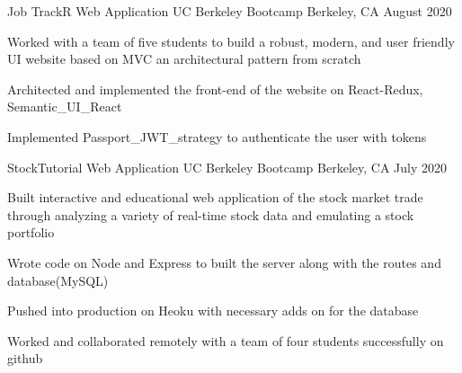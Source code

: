 \vspace{-5mm}
\vspace{-0.5mm}
\begin{cventries}
\cventry
    {Job TrackR Web Application}
    {UC Berkeley Bootcamp}
    {Berkeley, CA}
    {August 2020}
    {
      \begin{cvitems}
        \vspace{0.5mm} 
        \item {Worked with a team of five students to build a robust, modern, and user friendly UI website based on MVC an architectural pattern from scratch}
        \vspace{0.5mm}
        \item{ Architected and implemented the front-end of the website on React-Redux, Semantic\_UI\_React}
        \vspace{0.5mm}
        \item {Implemented Passport\_JWT\_strategy to authenticate the user with tokens}
      \end{cvitems}
    }
\vspace{-5mm} 

\cventry
    {Stock\-Tutorial Web Application}
    {UC Berkeley Bootcamp}
    {Berkeley, CA}
    {July 2020}
    {
      \begin{cvitems}
        \vspace{0.5mm} 
        \item {Built interactive and educational web application of the stock market trade through analyzing a variety of real-time stock data and emulating a stock portfolio}
        \item {Wrote code on Node and Express to built the server along with the routes and database(MySQL)}
        \item {Pushed into production on Heoku with necessary adds on for the database}
        \item {Worked and collaborated remotely with a team of four students successfully on github  }
      \end{cvitems}
    }
  \vspace{-5mm} 


\end{cventries}
